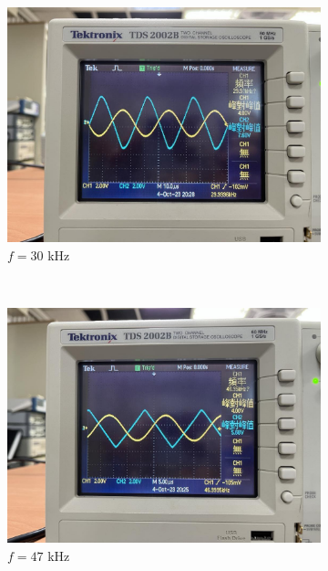 \documentclass{article}
\begin{document}
\begin{CJK*}{UTF8}{bkai}
\begin{center}
\begin{figure}[h]
    \begin{subfigure}[b]{0.3\textwidth}
        \includegraphics[width=\textwidth]{inv_30k.jpg}
        \caption{$f = 30$ \unit{\kilo\hertz}}
    \end{subfigure}
    ~
    \begin{subfigure}[b]{0.3\textwidth}
        \includegraphics[width=\textwidth]{inv_47k.jpg}
        \caption{$f = 47$ \unit{\kilo\hertz}}
    \end{subfigure}
    ~
    \begin{subfigure}[b]{0.3\textwidth}

\end{subfigure}
\end{figure}
\end{center}
\end{CJK*}
\end{document}
